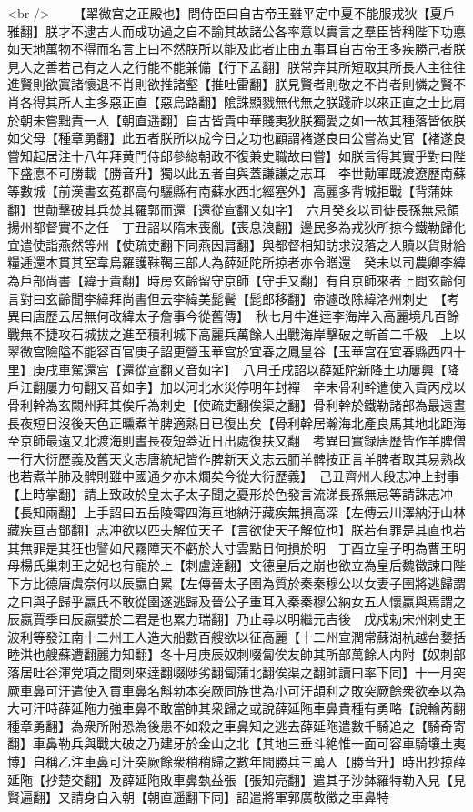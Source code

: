 <br />
　　【翠微宫之正殿也】問侍臣曰自古帝王雖平定中夏不能服戎狄【夏戶雅翻】朕才不逮古人而成功過之自不諭其故諸公各率意以實言之羣臣皆稱陛下功悳如天地萬物不得而名言上曰不然朕所以能及此者止由五事耳自古帝王多疾勝己者朕見人之善若己有之人之行能不能兼備【行下孟翻】朕常弃其所短取其所長人主往往進賢則欲寘諸懷退不肖則欲推諸壑【推吐雷翻】朕見賢者則敬之不肖者則憐之賢不肖各得其所人主多惡正直【惡烏路翻】隂誅顯戮無代無之朕踐祚以來正直之士比肩於朝未嘗黜責一人【朝直遥翻】自古皆貴中華賤夷狄朕獨愛之如一故其種落皆依朕如父母【種章勇翻】此五者朕所以成今日之功也顧謂褚遂良曰公嘗為史官【褚遂良嘗知起居注十八年拜黄門侍郎參縂朝政不復兼史職故曰嘗】如朕言得其實乎對曰陛下盛悳不可勝載【勝音升】獨以此五者自與蓋謙謙之志耳　李世勣軍既渡遼歷南蘇等數城【前漢書玄菟郡高句驪縣有南蘇水西北經塞外】高麗多背城拒戰【背蒲妹翻】世勣擊破其兵焚其羅郭而還【還從宣翻又如字】　六月癸亥以司徒長孫無忌領揚州都督實不之任　丁丑詔以隋末喪亂【喪息浪翻】邊民多為戎狄所掠今鐵勒歸化宜遣使詣燕然等州【使疏吏翻下同燕因肩翻】與都督相知訪求沒落之人贖以貨財給糧逓還本貫其室韋烏羅護靺鞨三部人為薛延陀所掠者亦令贈還　癸未以司農卿李緯為戶部尚書【緯于貴翻】時房玄齡留守京師【守手又翻】有自京師來者上問玄齡何言對曰玄齡聞李緯拜尚書但云李緯美髭鬢【髭郎移翻】帝遽改除緯洛州刺史　【考異曰唐歷云居無何改緯太子詹事今從舊傳】　秋七月牛進逹李海岸入高麗境凡百餘戰無不捷攻石城拔之進至積利城下高麗兵萬餘人出戰海岸擊破之斬首二千級　上以翠微宫險隘不能容百官庚子詔更營玉華宫於宜春之鳳皇谷【玉華宫在宜春縣西四十里】庚戌車駕還宫【還從宣翻又音如字】　八月壬戌詔以薛延陀新降土功屢興【降戶江翻屢力句翻又音如字】加以河北水災停明年封襌　辛未骨利幹遣使入貢丙戍以骨利幹為玄闕州拜其俟斤為刺史【使疏吏翻俟渠之翻】骨利幹於鐵勒諸部為最遠晝長夜短日沒後天色正曛煮羊脾適熟日已復出矣【骨利幹居瀚海北產良馬其地北距海至京師最遠又北渡海則晝長夜短蓋近日出處復扶又翻　考異曰實録唐歷皆作羊脾僧一行大衍歷義及舊天文志唐統紀皆作脾新天文志云胹羊髀按正言羊脾者取其易熟故也若煮羊肺及髀則雖中國通夕亦未爛矣今從大衍歷義】　己丑齊州人段志冲上封事【上時掌翻】請上致政於皇太子太子聞之憂形於色發言流涕長孫無忌等請誅志冲【長知兩翻】上手詔曰五岳陵霄四海亘地納汙藏疾無損高深【左傳云川澤納汙山林藏疾亘吉鄧翻】志冲欲以匹夫解位天子【言欲使天子解位也】朕若有罪是其直也若其無罪是其狂也譬如尺霧障天不虧於大寸雲點日何損於明　丁酉立皇子明為曹王明母楊氏巢刺王之妃也有寵於上【刺盧逹翻】文德皇后之崩也欲立為皇后魏徵諫曰陛下方比德唐虞奈何以辰嬴自累【左傳晉太子圉為質於秦秦穆公以女妻子圉將逃歸謂之曰與子歸乎嬴氏不敢從圉遂逃歸及晉公子重耳入秦秦穆公納女五人懷嬴與焉謂之辰嬴賈季曰辰嬴嬖於二君是也累力瑞翻】乃止尋以明繼元吉後　戊戍勅宋州刺史王波利等發江南十二州工人造大船數百艘欲以征高麗【十二州宣潤常蘇湖杭越台㜈括睦洪也艘蘇遭翻麗力知翻】冬十月庚辰奴刺啜匐俟友帥其所部萬餘人内附【奴刺部落居吐谷渾党項之間刺來逹翻啜陟劣翻匐蒲北翻俟渠之翻帥讀曰率下同】十一月突厥車鼻可汗遣使入貢車鼻名斛勃本突厥同族世為小可汗頡利之敗突厥餘衆欲奉以為大可汗時薛延陁力強車鼻不敢當帥其衆歸之或說薛延陁車鼻貴種有勇略【說輸芮翻種章勇翻】為衆所附恐為後患不如殺之車鼻知之逃去薛延陁遣數千騎追之【騎奇寄翻】車鼻勒兵與戰大破之乃建牙於金山之北【其地三垂斗絶惟一面可容車騎壤土夷博】自稱乙注車鼻可汗突厥餘衆稍稍歸之數年間勝兵三萬人【勝音升】時出抄掠薛延陁【抄楚交翻】及薛延陁敗車鼻埶益張【張知亮翻】遣其子沙鉢羅特勒入見【見賢遍翻】又請身自入朝【朝直遥翻下同】詔遣將軍郭廣敬徵之車鼻特